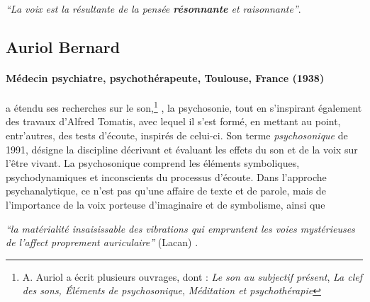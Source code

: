   \textit{``La voix est la
      résultante de la pensée \textbf{résonnante}  et raisonnante''}. \autocite{bonhomme-key}
      \subsection{Auriol Bernard}
 
\paragraph{Médecin psychiatre,
   psychothérapeute, Toulouse, France (1938)}
a étendu ses recherches sur le son,\footnote{ A. Auriol a écrit plusieurs ouvrages, dont : \textsl{Le son au subjectif présent}, \textsl{La clef des sons, Éléments de psychosonique}, \textsl{Méditation et
  psychothérapie}} \autocite{auriol_stress}, la psychosonie, 
tout en s'inspirant également des
travaux d'Alfred Tomatis, avec lequel il s'est formé, en mettant au
point, entr'autres, des tests
d'écoute, inspirés de celui-ci. 
Son terme \emph{psychosonique} de 1991,
désigne la discipline décrivant et évaluant les effets du
son et de la voix sur l'être vivant.
La psychosonique comprend les éléments
symboliques, psychodynamiques et inconscients du processus
d'écoute.
Dans l'approche  psychanalytique, ce n'est pas qu'une affaire de
texte et de parole, mais de l'importance de la voix porteuse
d'imaginaire et de symbolisme, ainsi que

\textsf{\textit{``la matérialité insaisissable
  des vibrations qui empruntent  les voies mystérieuses de
l'affect proprement auriculaire''}
(Lacan)}
\autocite[ch. 13]{auriol:cle}.





